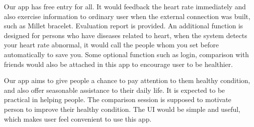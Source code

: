 Our app has free entry for all. It would feedback the heart rate immediately and also exercise information to ordinary user when the external connection was built, such as Millet bracelet. Evaluation report is provided. An additional function is designed for persons who have diseases related to heart, when the system detects your heart rate abnormal, it would call the people whom you set before automatically to save you. Some optional function such as login, comparison with friends would also be attached in this app to encourage user to be healthier. 
 
Our app aims to give people a chance to pay attention to them healthy condition, and also offer seasonable assistance to their daily life. It is expected to be practical in helping people. The comparison session is supposed to motivate person to improve their healthy condition. The UI would be simple and useful, which makes user feel convenient to use this app. 